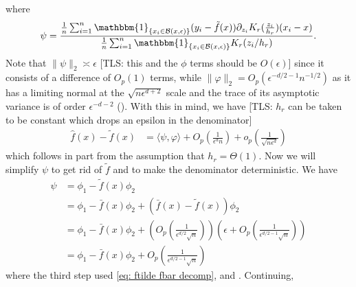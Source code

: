 \documentclass[11pt]{article}
\newcommand{\tls}[1]{{\color{cyan}[TLS: #1]}}
\begin{document}
where
\begin{equation}
    \psi = \frac{\frac{1}{n}\sum_{i = 1}^n\mathbbm{1}_{\{x_i \in \mathcal{B}(x, \epsilon)\}}(y_i - \tilde{f}(x))\partial_{z_i}K_r(\frac{z_i}{h_r})(x_i - x)}{\frac{1}{n}\sum_{i = 1}^n\mathbbm{1}_{\{x_i \in \mathcal{B}(x, \epsilon)\}}K_r(z_i/h_r)}.
\end{equation}
Note that $\|\psi\|_2 \asymp \epsilon$ \tls{this and the $\phi$ terms should be $O(\epsilon)$} since it consists of a difference of $O_p(1)$ terms, while $\|\varphi\|_2 = O_p(\epsilon^{-d/2 -1}n^{-1/2})$ as it has a limiting normal at the $\sqrt{n\epsilon^{d+2}}$ scale and the trace of its asymptotic variance is of order $\epsilon^{-d-2}$ (). With this in mind, we have \tls{$h_r$ can be taken to be constant which drops an epsilon in the denominator}
\begin{align}
    \hat{f}(x) - \tilde{f}(x) &= \langle\psi, \varphi\rangle + O_p\left(\frac{1}{\epsilon^{d }n}\right) + o_p\left(\frac{1}{\sqrt{n\epsilon^d}}\right)
\end{align}
which follows in part from the assumption that $h_r = \Theta(1)$. Now we will simplify $\psi$ to get rid of $\tilde{f}$ and to make the denominator deterministic. We have
\begin{align}
    \psi &= \phi_1 - \tilde{f}(x)\phi_2 \\
    &= \phi_1 - \bar{f}(x)\phi_2 + (\bar{f}(x) - \tilde{f}(x))\phi_2 \\
    &= \phi_1 - \bar{f}(x)\phi_2 + \left(O_p\left(\frac{1}{\epsilon^{d/2}\sqrt{n}}\right)\right)\left(\epsilon +O_p\left(\frac{1}{\epsilon^{d/2-1}\sqrt{n}}\right)\right) \\
    &= \phi_1 - \bar{f}(x)\phi_2 + O_p\left(\frac{1}{\epsilon^{d/2-1}\sqrt{n}}\right)
\end{align}
where the third step used \cref{eq: ftilde fbar decomp},  and . Continuing,
\end{document}
